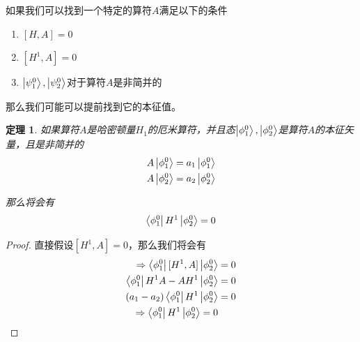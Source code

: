 \documentclass{article}
\newtheorem{theorem}{定理}
\begin{document}
如果我们可以找到一个特定的算符$A$满足以下的条件
\begin{enumerate}
	\item $[H,A]=0$
	\item $[H^1,A]=0$
	\item $\ket{\psi_1^0},\ket{\psi_2^0}$对于算符$A$是非简并的
\end{enumerate}

那么我们可能可以提前找到它的本征值。

\begin{theorem}
	如果算符$A$是哈密顿量$H_1$的厄米算符，并且态$\ket{\phi_1^0},\ket{\phi_2^0}$是算符$A$的本征矢量，且是非简并的
	\begin{align*}
		A\ket{\phi_1^0}=a_1\ket{\phi_1^0} \\
		A\ket{\phi_2^0}=a_2\ket{\phi_2^0}
	\end{align*}

	那么将会有
	\begin{align*}
		\bra{\phi_1^0}H^1\ket{\phi_2^0}=0
	\end{align*}
\end{theorem}

\begin{proof}
	直接假设$[H^1,A]=0$，那么我们将会有
	\begin{align*}
		\Rightarrow \bra{\phi_1^0}[H^1,A]\ket{\phi_2^0} & =0 \\
		\bra{\phi_1^0}H^1A-AH^1\ket{\phi_2^0}           & =0 \\
		(a_1-a_2)\bra{\phi_1^0}H^1\ket{\phi_2^0}        & =0 \\
		\Rightarrow \bra{\phi_1^0}H^1\ket{\phi_2^0}=0
	\end{align*}
\end{proof}
\end{document}
